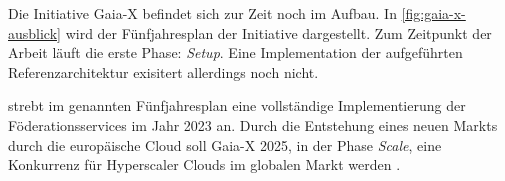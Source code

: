 Die Initiative Gaia-X befindet sich zur Zeit noch im Aufbau.
In \ref{fig:gaia-x-ausblick} wird der Fünfjahresplan der Initiative dargestellt.
Zum Zeitpunkt der Arbeit läuft die erste Phase: \emph{Setup}.
Eine Implementation der aufgeführten Referenzarchitektur exisitert allerdings noch nicht.

\citeauthor{Bonfiglio2021} strebt im genannten Fünfjahresplan eine vollständige Implementierung der Föderationsservices
im Jahr 2023 an.
Durch die Entstehung eines neuen Markts durch die europäische Cloud soll Gaia-X 2025, in der Phase \emph{Scale},
eine Konkurrenz für Hyperscaler Clouds im globalen Markt werden \cite{Bonfiglio2021}.

